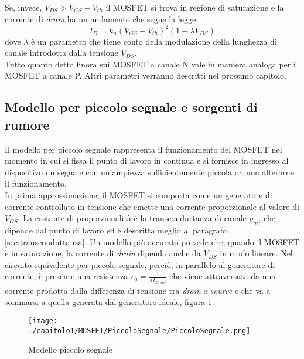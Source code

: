 Se, invece, $V_{DS} > V_{GS} -  V_{th}$ il MOSFET si trova in regione di saturazione e la corrente di \emph{drain} ha un andamento che segue la legge:
\begin{equation}
  I_D = k_n\left(V_{GS}-V_{th}\right)^2 (1+\lambda V_{DS})
\end{equation}
dove $\lambda$ è un parametro che tiene conto della modulazione della lunghezza di canale introdotta dalla tensione $V_{DS}$.\\

Tutto quanto detto finora sui MOSFET a canale N vale in maniera analoga per i MOSFET a canale P.
Altri parametri verranno descritti nel prossimo capitolo.

\subsection{Modello per piccolo segnale e sorgenti di rumore}
Il modello per piccolo segnale rappresenta il funzionamento del MOSFET nel momento in cui si fissa il punto di lavoro in continua e si fornisce in ingresso al dispositivo un segnale con un'ampiezza sufficientemente piccola da non alterarne il funzionamento. \\

In prima approssimazione, il MOSFET si comporta come un generatore di corrente controllato in tensione che emette una corrente proporzionale al valore di $V_{GS}$. La costante di proporzionalità è la transconduttanza di canale $g_m$, che dipende dal punto di lavoro ed è descritta meglio al paragrafo \ref{sec:transconduttanza}. Un modello più accurato prevede che, quando il MOSFET è in saturazione, la corrente di \emph{drain} dipenda anche da $V_{DS}$ in modo lineare. Nel circuito equivalente per piccolo segnale, perciò, in parallelo al generatore di corrente, è presente una resistenza $r_0 = \frac{1}{\lambda I_{D,sat}}$ che viene attraversata da una corrente prodotta dalla differenza di tensione tra \emph{drain} e \emph{source} e che va a sommarsi a quella generata dal generatore ideale, figura \ref{fig:piccolo_segnale}.

\begin{figure}[t]
  
  \centering
  \texttt{[image: ./capitolo1/MOSFET/PiccoloSegnale/PiccoloSegnale.png]}
  \caption[Modello piccolo segnale]{Modello piccolo segnale}
  \label{fig:piccolo_segnale}

\end{figure}

